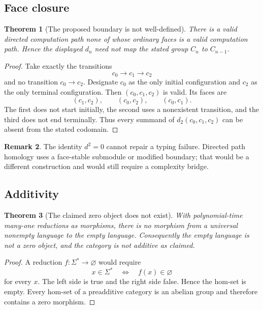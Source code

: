 \documentclass[11pt]{article}
\newtheorem{theorem}{Theorem}[section]
\theoremstyle{definition}
\newtheorem{remark}[theorem]{Remark}
\begin{document}
\subsection{Face closure}

\begin{theorem}[The proposed boundary is not well-defined]
There is a valid directed computation path none of whose ordinary faces is a
valid computation path. Hence the displayed \(d_n\) need not map the stated
group \(C_n\) to \(C_{n-1}\).
\end{theorem}

\begin{proof}
Take exactly the transitions
\[
 c_0\longrightarrow c_1\longrightarrow c_2
\]
and no transition \(c_0\to c_2\). Designate \(c_0\) as the only initial
configuration and \(c_2\) as the only terminal configuration. Then
\((c_0,c_1,c_2)\) is valid. Its faces are
\[
 (c_1,c_2),\qquad(c_0,c_2),\qquad(c_0,c_1).
\]
The first does not start initially, the second uses a nonexistent transition,
and the third does not end terminally. Thus every summand of
\(d_2(c_0,c_1,c_2)\) can be absent from the stated codomain.
\end{proof}

\begin{remark}
The identity \(d^2=0\) cannot repair a typing failure. Directed path homology
uses a face-stable submodule or modified boundary; that would be a different
construction and would still require a complexity bridge.
\end{remark}

\subsection{Additivity}

\begin{theorem}[The claimed zero object does not exist]
With polynomial-time many-one reductions as morphisms, there is no morphism
from a universal nonempty language to the empty language. Consequently the
empty language is not a zero object, and the category is not additive as
claimed.
\end{theorem}

\begin{proof}
A reduction \(f:\Sigma^*\to\varnothing\) would require
\[
 x\in\Sigma^*\quad\Longleftrightarrow\quad f(x)\in\varnothing
\]
for every \(x\). The left side is true and the right side false. Hence the
hom-set is empty. Every hom-set of a preadditive category is an abelian group
and therefore contains a zero morphism.
\end{proof}
\end{document}

